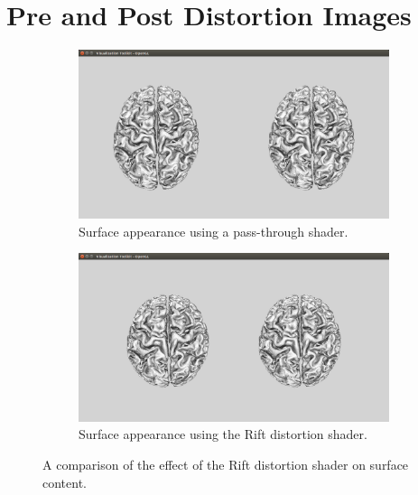 \documentclass[MSc,paper=a4,pagesize=auto]{icldt}
\begin{document}
\chapter{Pre and Post Distortion Images}
\begin{figure}[htbp!]
\centering
\begin{subfigure}{\textwidth}
    \centering
    \includegraphics[width=\linewidth]{resources/undistorted_surface}
    \caption{Surface appearance using a pass-through shader.}
	\label{fig:undistorted_surface}
\end{subfigure}

\centering
\begin{subfigure}{\textwidth}
    \centering
    \includegraphics[width=\linewidth]{resources/distorted_surface}
    \caption{Surface appearance using the Rift distortion shader.}
	\label{fig:distorted_surface}
\end{subfigure}
    
    \caption{A comparison of the effect of the Rift distortion shader on surface content.}
    \label{fig:surface_distortion_comparison}
\end{figure}
\end{document}

